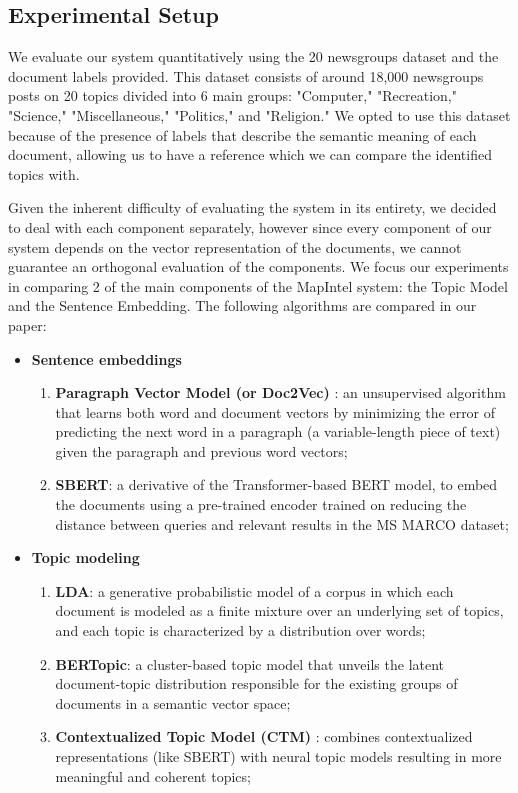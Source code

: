 \documentclass[a4paper]{article}
\begin{document}
\subsection{Experimental Setup}
We evaluate our system quantitatively using the 20 newsgroups \citep{pedregosa2011} dataset and the document labels provided. This dataset consists of around 18,000 newsgroups posts on 20 topics divided into 6 main groups: "Computer," "Recreation," "Science," "Miscellaneous," "Politics," and "Religion." We opted to use this dataset because of the presence of labels that describe the semantic meaning of each document, allowing us to have a reference which we can compare the identified topics with.

Given the inherent difficulty of evaluating the system in its entirety, we decided to deal with each component separately, however since every component of our system depends on the vector representation of the documents, we cannot guarantee an orthogonal evaluation of the components. We focus our experiments in comparing 2 of the main components of the MapIntel system: the Topic Model and the Sentence Embedding. The following algorithms are compared in our paper:
\begin{itemize}
  \item \textbf{Sentence embeddings}
    \begin{enumerate}
      \item \textbf{Paragraph Vector Model (or Doc2Vec)} \citep{le2014}: an unsupervised algorithm that learns both word and document vectors by minimizing the error of predicting the next word in a paragraph (a variable-length piece of text) given the paragraph and previous word vectors;
      \item \textbf{SBERT}: a derivative of the Transformer-based BERT model, to embed the documents using a pre-trained encoder trained on reducing the distance between queries and relevant results in the MS MARCO dataset; 
    \end{enumerate}
  \item \textbf{Topic modeling}
    \begin{enumerate}
      \item \textbf{LDA}: a generative probabilistic model of a corpus in which each document is modeled as a finite mixture over an underlying set of topics, and each topic is characterized by a distribution over words;
      \item \textbf{BERTopic}: a cluster-based topic model that unveils the latent document-topic distribution responsible for the existing groups of documents in a semantic vector space;
      \item \textbf{Contextualized Topic Model (CTM)} \citep{bianchi2021}: combines contextualized representations (like SBERT) with neural topic models resulting in more meaningful and coherent topics;
    \end{enumerate}
\end{itemize}
\end{document}
